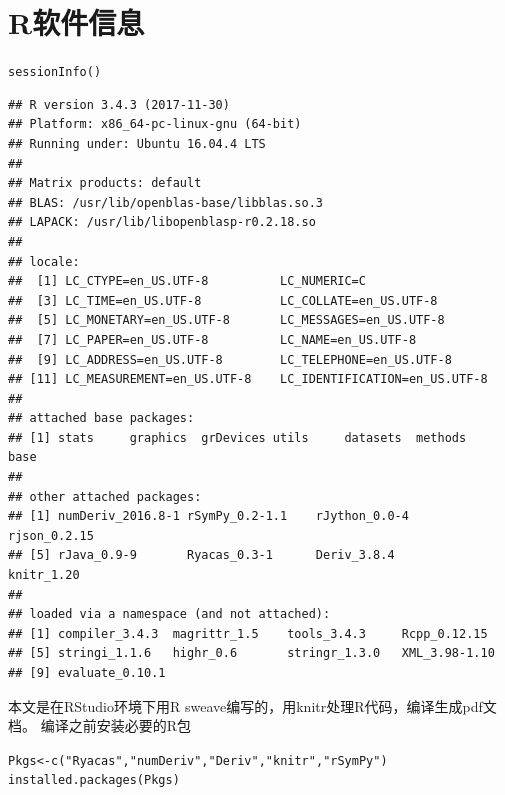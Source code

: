 \documentclass[a4paper]{ctexart}\usepackage[]{graphicx}\usepackage[]{color}
\makeatletter
\newcommand{\hlstr}[1]{\textcolor[rgb]{1,0.4,0.2}{#1}}%
\newcommand{\hlstd}[1]{\textcolor[rgb]{0.251,0.251,0.251}{#1}}%
\newcommand{\hlkwb}[1]{\textcolor[rgb]{0,0.439,0.902}{#1}}%
\newcommand{\hlkwd}[1]{\textcolor[rgb]{0.69,0.188,0.941}{#1}}%
\newenvironment{kframe}{%
 \def\at@end@of@kframe{}%
 \ifinner\ifhmode%
  \def\at@end@of@kframe{\end{minipage}}%
  \begin{minipage}{\columnwidth}%
 \fi\fi%
 \def\FrameCommand##1{\hskip\@totalleftmargin \hskip-\fboxsep
 \colorbox{shadecolor}{##1}\hskip-\fboxsep
     \hskip-\linewidth \hskip-\@totalleftmargin \hskip\columnwidth}%
 \MakeFramed {\advance\hsize-\width
   \@totalleftmargin\z@ \linewidth\hsize
   \@setminipage}}%
 {\par\unskip\endMakeFramed%
 \at@end@of@kframe}
\newenvironment{knitrout}{}{} %
\makeatother
\begin{document}
\section{R软件信息}

\begin{knitrout}
\color{fgcolor}\begin{kframe}
\begin{alltt}
\hlkwd{sessionInfo}\hlstd{()}
\end{alltt}
\begin{verbatim}
## R version 3.4.3 (2017-11-30)
## Platform: x86_64-pc-linux-gnu (64-bit)
## Running under: Ubuntu 16.04.4 LTS
## 
## Matrix products: default
## BLAS: /usr/lib/openblas-base/libblas.so.3
## LAPACK: /usr/lib/libopenblasp-r0.2.18.so
## 
## locale:
##  [1] LC_CTYPE=en_US.UTF-8          LC_NUMERIC=C                 
##  [3] LC_TIME=en_US.UTF-8           LC_COLLATE=en_US.UTF-8       
##  [5] LC_MONETARY=en_US.UTF-8       LC_MESSAGES=en_US.UTF-8      
##  [7] LC_PAPER=en_US.UTF-8          LC_NAME=en_US.UTF-8          
##  [9] LC_ADDRESS=en_US.UTF-8        LC_TELEPHONE=en_US.UTF-8     
## [11] LC_MEASUREMENT=en_US.UTF-8    LC_IDENTIFICATION=en_US.UTF-8
## 
## attached base packages:
## [1] stats     graphics  grDevices utils     datasets  methods   base     
## 
## other attached packages:
## [1] numDeriv_2016.8-1 rSymPy_0.2-1.1    rJython_0.0-4     rjson_0.2.15     
## [5] rJava_0.9-9       Ryacas_0.3-1      Deriv_3.8.4       knitr_1.20       
## 
## loaded via a namespace (and not attached):
## [1] compiler_3.4.3  magrittr_1.5    tools_3.4.3     Rcpp_0.12.15   
## [5] stringi_1.1.6   highr_0.6       stringr_1.3.0   XML_3.98-1.10  
## [9] evaluate_0.10.1
\end{verbatim}
\end{kframe}
\end{knitrout}

本文是在RStudio环境下用R sweave编写的，用knitr\cite{R-knitr}处理R代码，\XeLaTeX{}编译生成pdf文档。 编译之前安装必要的R包

\begin{knitrout}
\color{fgcolor}\begin{kframe}
\begin{alltt}
\hlstd{Pkgs} \hlkwb{<-} \hlkwd{c}\hlstd{(}\hlstr{"Ryacas"}\hlstd{,}\hlstr{"numDeriv"}\hlstd{,}\hlstr{"Deriv"}\hlstd{,}\hlstr{"knitr"}\hlstd{,}\hlstr{"rSymPy"}\hlstd{)}
\hlkwd{installed.packages}\hlstd{(Pkgs)}
\end{alltt}
\end{kframe}
\end{knitrout}


\renewcommand\refname{参考文献} 

 
\end{document}
